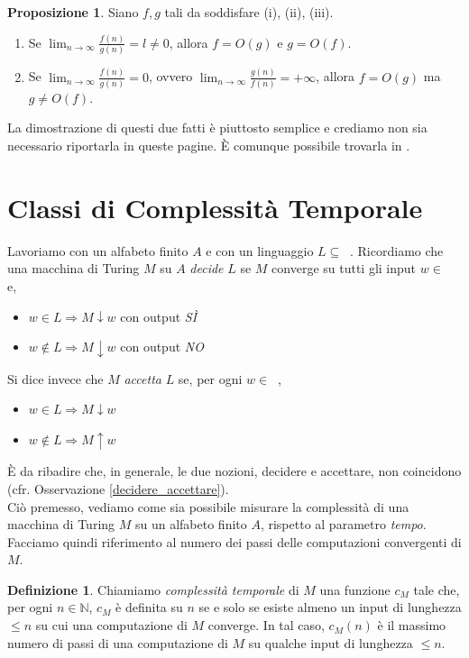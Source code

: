 \documentclass[12pt,a4paper]{report}
\theoremstyle{definition}
\newtheorem{defn}[teo]{Definizione}  %
\newtheorem{prop}[teo]{Proposizione}  %
\DeclareMathOperator{\aaa}{\textit{A}^{\star}}
\begin{document}
\begin{prop}
Siano $f,g$ tali da soddisfare (i), (ii), (iii).
\begin{enumerate}
\item Se $\lim_{n \to \infty} \frac{f(n)}{g(n)} = l \neq 0$, allora $f=O(g)$ e $g=O(f)$.
\item Se $\lim_{n \to \infty} \frac{f(n)}{g(n)} = 0$, ovvero $\lim_{n \to \infty} \frac{g(n)}{f(n)} = +\infty$, allora $f=O(g)$ ma $g \neq O(f)$.
\end{enumerate}
\end{prop}

La dimostrazione di questi due fatti è piuttosto semplice e crediamo non sia necessario riportarla in queste pagine. È comunque possibile trovarla in \cite[pag. 126]{Toffalori:tesi}.


\section{Classi di Complessità Temporale}

Lavoriamo con un alfabeto finito $A$ e con un linguaggio $L \subseteq \aaa$. Ricordiamo che una macchina di Turing $M$ su $A$ \emph{decide} $L$ se $M$ converge su tutti gli input $w \in \aaa$ e, 
\begin{itemize}
\item $w \in L \Longrightarrow M \downarrow w$ con output \emph{SÌ}
\item $w \not\in L \Longrightarrow M \downarrow w$ con output \emph{NO}
\end{itemize}

Si dice invece che $M$ \emph{accetta} $L$ se, per ogni $w \in \aaa$, 
\begin{itemize}
\item $w \in L \Longrightarrow M \downarrow w$
\item $w \not\in L \Longrightarrow M \uparrow w$
\end{itemize}

È da ribadire che, in generale, le due nozioni, decidere e accettare, non coincidono (cfr. Osservazione \ref{decidere_accettare}).\\
Ciò premesso, vediamo come sia possibile misurare la complessità di una macchina di Turing $M$ su un alfabeto finito $A$, rispetto al parametro \emph{tempo}. Facciamo quindi riferimento al numero dei passi delle computazioni convergenti di $M$.

\begin{defn}
Chiamiamo \emph{complessità temporale} di $M$ una funzione $c_M$ tale che, per ogni $n \in \mathbb{N}$, $c_M$ è definita su $n$ se e solo se esiste almeno un input di lunghezza $\leq n$ su cui una computazione di $M$ converge. In tal caso, $c_M (n)$ è il massimo numero di passi di una computazione di $M$ su qualche input di lunghezza $\leq n$.
\end{defn}
\end{document}
